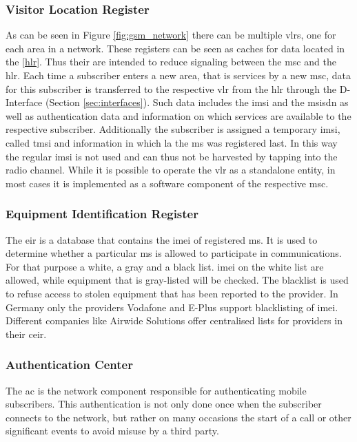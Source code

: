 \subsubsection{Visitor Location Register}
As can be seen in Figure \ref{fig:gsm_network} there can be multiple \gls{vlr}s, one for each area in a network.
These registers can be seen as caches for data located in the \ref{hlr}.
Thus their are intended to reduce signaling between the \gls{msc} and the \gls{hlr}.
Each time a subscriber enters a new area, that is services by a new \gls{msc}, data for this subscriber is transferred to the respective \gls{vlr} from the \gls{hlr} through the D-Interface (\cf Section \ref{sec:interfaces}).
Such data includes the \gls{imsi} and the \gls{msisdn} as well as authentication data and information on which services are available to the respective subscriber.
Additionally the subscriber is assigned a temporary \gls{imsi}, called \gls{tmsi} and information in which \gls{la} the \gls{ms} was registered last.
In this way the regular \gls{imsi} is not used and can thus not be harvested by tapping into the radio channel.
While it is possible to operate the \gls{vlr} as a standalone entity, in most cases it is implemented as a software component of the respective \gls{msc}.

\subsubsection{Equipment Identification Register}
The \gls{eir} is a database that contains the \gls{imei} of registered \gls{ms}.
It is used to determine whether a particular \gls{ms} is allowed to participate in communications.
For that purpose a white, a gray and a black list.
\gls{imei} on the white list are allowed, while equipment that is gray-listed will be checked.
The blacklist is used to refuse access to \eg stolen equipment that has been reported to the provider.
In Germany only the providers Vodafone and E-Plus support blacklisting of \gls{imei}\cite{blacklisting}.
Different companies like Airwide Solutions offer centralised lists for providers in their \gls{ceir}.

\subsubsection{Authentication Center}
The \gls{ac} is the network component responsible for authenticating mobile subscribers.
This authentication is not only done once when the subscriber connects to the network, but rather on many occasions \eg the start of a call or other significant events to avoid misuse by a third party.


